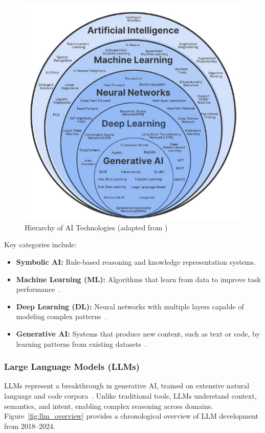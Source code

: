 \begin{spacing}{1.2}
\begin{figure}[H]
\centering
\includegraphics[scale=0.6]{Images/AI.png}
\caption{Hierarchy of AI Technologies (adapted from \cite{apr_ai_intro})}
\label{fig:ai_hierarchy}
\end{figure}

Key categories include:

\begin{itemize}
\item \textbf{Symbolic AI:} Rule-based reasoning and knowledge representation systems.
\item \textbf{Machine Learning (ML):} Algorithms that learn from data to improve task performance~\cite{ml2024definition}.
\item \textbf{Deep Learning (DL):} Neural networks with multiple layers capable of modeling complex patterns~\cite{dl2024definition}.
\item \textbf{Generative AI:} Systems that produce new content, such as text or code, by learning patterns from existing datasets~\cite{generative_ai2024}.
\end{itemize}

\subsubsection{Large Language Models (LLMs)}
LLMs represent a breakthrough in generative AI, trained on extensive natural language and code corpora~\cite{llm2024breakthrough}. Unlike traditional tools, LLMs understand context, semantics, and intent, enabling complex reasoning across domains. Figure~\ref{fig:llm_overview} provides a chronological overview of LLM development from 2018–2024.


\end{spacing}
